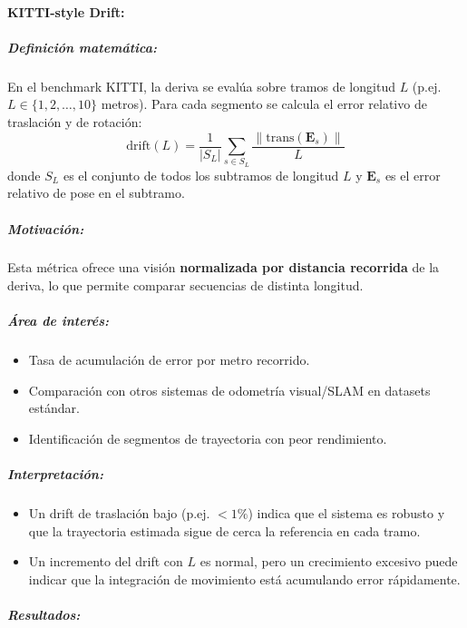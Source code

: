 \documentclass[12pt, a4paper, twoside]{article}
\begin{document}
\paragraph{KITTI-style Drift:}

\subparagraph{Definición matemática:}
En el benchmark KITTI, la deriva se evalúa sobre tramos de longitud $L$ (p.ej. $L \in \{1,2, \dots,10\}$ metros).
Para cada segmento se calcula el error relativo de traslación y de rotación:
\[
\text{drift}(L) = 
\frac{1}{|S_L|} \sum_{s \in S_L}
\frac{\| \mathrm{trans}(\mathbf{E}_s)\|}{L}
\]
donde $S_L$ es el conjunto de todos los subtramos de longitud $L$ y 
$\mathbf{E}_s$ es el error relativo de pose en el subtramo.

\subparagraph{Motivación:}
Esta métrica ofrece una visión \textbf{normalizada por distancia recorrida} 
de la deriva, lo que permite comparar secuencias de distinta longitud.

\subparagraph{Área de interés:}
\begin{itemize}
  \item Tasa de acumulación de error por metro recorrido.
  \item Comparación con otros sistemas de odometría visual/SLAM en datasets estándar.
  \item Identificación de segmentos de trayectoria con peor rendimiento.
\end{itemize}

\subparagraph{Interpretación:}
\begin{itemize}
  \item Un drift de traslación bajo (p.ej. $< 1\%$) indica que el sistema es robusto 
  y que la trayectoria estimada sigue de cerca la referencia en cada tramo.
  \item Un incremento del drift con $L$ es normal, pero un crecimiento excesivo 
  puede indicar que la integración de movimiento está acumulando error rápidamente.
\end{itemize}

\subparagraph{Resultados:}
\end{document}
